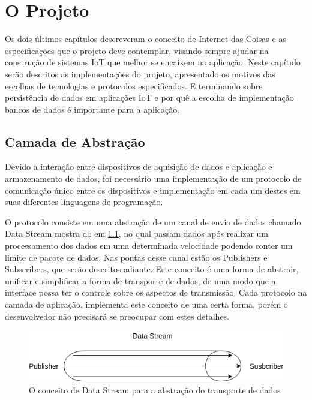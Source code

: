 \chapter{O Projeto}
\label{chapter:projeto}

Os dois últimos capítulos descreveram o conceito de Internet das Coisas e as especificações que o projeto deve contemplar, visando sempre ajudar na construção de sistemas IoT que melhor se encaixem na aplicação. Neste capítulo serão descritos as implementações do projeto, apresentado os motivos das escolhas de tecnologias e protocolos especificados. E terminando sobre persistência de dados em aplicações IoT e por quê a escolha de implementação bancos de dados é importante para a aplicação.


\section{Camada de Abstração}
\label{section:camada_abstracao}

Devido a interação entre dispositivos de aquisição de dados e aplicação e armazenamento de dados, foi necessário uma implementação de um protocolo de comunicação único entre os dispositivos e implementação em cada um destes em suas diferentes linguagens de programação.

O protocolo consiste em uma abstração de um canal de envio de dados chamado Data Stream mostra
do em \ref{fig:3.1.0/data_stream}, no qual passam dados após realizar um processamento dos dados em uma determinada velocidade podendo conter um limite de pacote de dados. Nas pontas desse canal estão os Publishers e Subscribers, que serão descritos adiante. Este conceito é uma forma de abstrair, unificar e simplificar a forma de transporte de dados, de uma modo que a interface possa ter o controle sobre os aspectos de transmissão. Cada protocolo na camada de aplicação, implementa este conceito de uma certa forma, porém o desenvolvedor não precisará se preocupar com estes detalhes.

\begin{figure}[h!]
\centering
\includegraphics[width=13cm]{./02_Capitulos/02_Cap3/figures/data_stream}
\caption{O conceito de Data Stream para a abstração do transporte de dados}
\label{fig:3.1.0/data_stream}
\end{figure}


